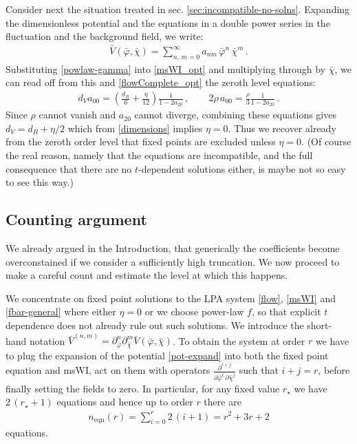 \documentclass[11pt,draft]{book} %
\newcommand{\bp}{\bar \varphi}
\newcommand{\bc}{\bar \chi}
\begin{document}
Consider next the situation treated in sec. \ref{sec:incompatible-no-solns}.
Expanding the dimensionless potential and the equations in a double power series in the fluctuation and
the background field, we write:
\begin{align}
  \label{pot-expand}
  \bar V(\bar\varphi,\bar\chi) = \sum_{n,\,m=0}^{\infty} a_{nm} \, \bar\varphi^n \, \bar\chi^m\,.
\end{align}
Substituting \eqref{powlaw-gamma} into \eqref{msWI_opt} and multiplying through by $\bc$,
we can read off from this and \eqref{flowComplete_opt} the zeroth level equations:
\begin{align}
  d_V a_{00} = \left(  \frac{d_R}{6} + \frac{\eta}{12} \right) \frac{1}{1 -  2a_{20}}\,,\qquad 2\rho\, a_{00} = \frac{\rho}{3} \frac{1}{1 -  2a_{20}}\,.
\end{align}
Since $\rho$ cannot vanish and $a_{20}$ cannot diverge,
combining these equations gives $d_V = d_R+\eta/2$ which from \eqref{dimensions} implies $\eta=0$.
Thus we recover already from the zeroth order level that fixed points are excluded unless $\eta=0$.
(Of course the real reason, namely that the equations are incompatible,
and the full consequence that there are no $t$-dependent solutions either,
is maybe not so easy to see this way.)


\subsection{Counting argument}\label{sec:counting}

We already argued in the Introduction, that generically the coefficients become overconstained if we
consider a sufficiently high truncation. We now proceed to make a careful count and estimate the
level at which this happens.

We concentrate on fixed point solutions to the LPA system \eqref{flow},
\eqref{msWI} and \eqref{fbar-general} where either $\eta=0$ or we choose power-law $f$,
so that explicit $t$ dependence does not already rule out such solutions.
We introduce the short-hand notation
$\bar V ^{(n,m)}=\partial_{\bar \varphi}^n \partial_{\bar \chi}^m \bar V(\bp,\bc)$.
To obtain the system at order $r$ we have to plug the expansion of the potential \eqref{pot-expand}
into both the fixed point equation and msWI, act on them with operators
$\frac{\partial^{i+j}}{\partial \bar\varphi^i \, \partial \bar\chi^j}$ such that $i+j=r$,
before finally setting the fields to zero.
In particular, for any fixed value $r_{\star}$ we have $2 \, (r_{\star}+1)$ equations
and hence up to order $r$ there are
\begin{align}
  \label{number_eqns}
  n_{\text{eqn}}(r) = \sum_{i=0}^{r} 2\,(i+1) = r^2 + 3r + 2
\end{align}
equations.
\end{document}
